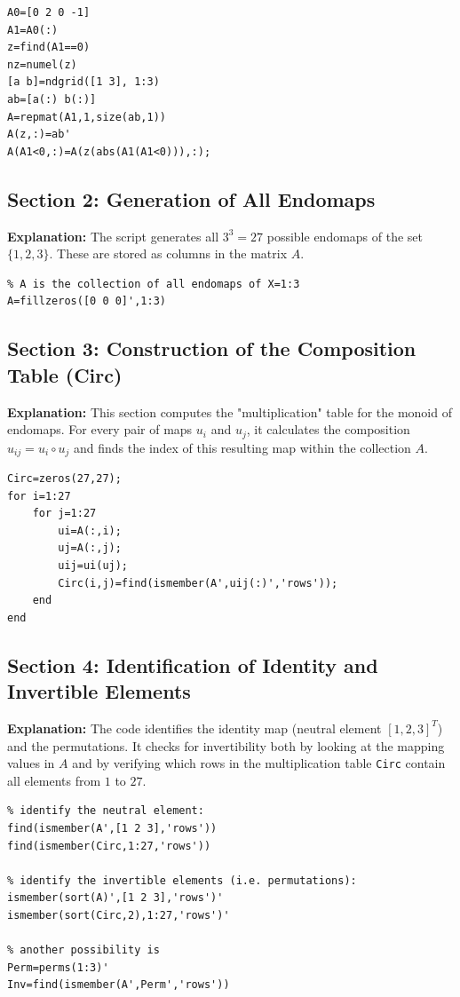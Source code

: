 \begin{lstlisting}
A0=[0 2 0 -1]
A1=A0(:)
z=find(A1==0)
nz=numel(z)
[a b]=ndgrid([1 3], 1:3)
ab=[a(:) b(:)]
A=repmat(A1,1,size(ab,1))
A(z,:)=ab'
A(A1<0,:)=A(z(abs(A1(A1<0))),:);
\end{lstlisting}

\subsection{Section 2: Generation of All Endomaps}
\textbf{Explanation:} The script generates all $3^3 = 27$ possible endomaps of the set $\{1, 2, 3\}$. These are stored as columns in the matrix $A$.
\begin{lstlisting}
% A is the collection of all endomaps of X=1:3
A=fillzeros([0 0 0]',1:3)
\end{lstlisting}

\subsection{Section 3: Construction of the Composition Table (Circ)}
\textbf{Explanation:} This section computes the "multiplication" table for the monoid of endomaps. For every pair of maps $u_i$ and $u_j$, it calculates the composition $u_{ij} = u_i \circ u_j$ and finds the index of this resulting map within the collection $A$.
\begin{lstlisting}
Circ=zeros(27,27);
for i=1:27
    for j=1:27
        ui=A(:,i);
        uj=A(:,j);
        uij=ui(uj);
        Circ(i,j)=find(ismember(A',uij(:)','rows'));
    end
end
\end{lstlisting}

\subsection{Section 4: Identification of Identity and Invertible Elements}
\textbf{Explanation:} The code identifies the identity map (neutral element $[1, 2, 3]^T$) and the permutations. It checks for invertibility both by looking at the mapping values in $A$ and by verifying which rows in the multiplication table \texttt{Circ} contain all elements from $1$ to $27$.
\begin{lstlisting}
% identify the neutral element:
find(ismember(A',[1 2 3],'rows'))
find(ismember(Circ,1:27,'rows'))

% identify the invertible elements (i.e. permutations):
ismember(sort(A)',[1 2 3],'rows')'
ismember(sort(Circ,2),1:27,'rows')'

% another possibility is
Perm=perms(1:3)'
Inv=find(ismember(A',Perm','rows'))
\end{lstlisting}

